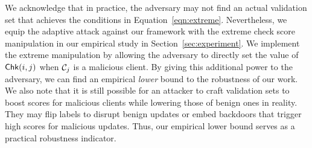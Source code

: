  We acknowledge that in practice, the adversary may not find an actual validation set that achieves the conditions in Equation~\ref{eqn:extreme}. Nevertheless, we equip the adaptive attack against our framework with the extreme check score manipulation in our empirical study in Section~\ref{sec:experiment}.
We implement the extreme manipulation by allowing the adversary to directly set the value of $\mathsf{Chk}(i, j)$ when $\mathcal{C}_j$ is a malicious client. By giving this additional power to the adversary, we can find an empirical \emph{lower} bound to the robustness of our work. 
We also note that it is still possible for an attacker to craft validation sets to boost scores for malicious clients while lowering those of benign ones in reality. 
They may flip labels to disrupt benign updates or embed backdoors that trigger high scores for malicious updates.
Thus, our empirical lower bound serves as a practical robustness indicator.







